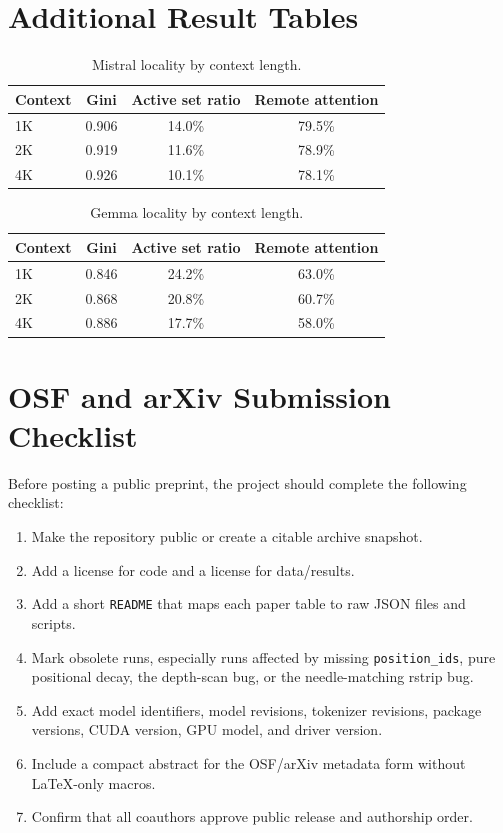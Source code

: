 \documentclass[11pt]{article}
\newcommand{\pct}{\%}
\theoremstyle{definition}
\theoremstyle{plain}
\begin{document}
\appendix

\section{Additional Result Tables}
\label{app:tables}

\begin{table}[h]
\centering
\caption{Mistral locality by context length.}
\small
\begin{tabular}{lccc}
\toprule
Context & Gini & Active set ratio & Remote attention \\
\midrule
1K & 0.906 & 14.0\pct{} & 79.5\pct{} \\
2K & 0.919 & 11.6\pct{} & 78.9\pct{} \\
4K & 0.926 & 10.1\pct{} & 78.1\pct{} \\
\bottomrule
\end{tabular}
\end{table}

\begin{table}[h]
\centering
\caption{Gemma locality by context length.}
\small
\begin{tabular}{lccc}
\toprule
Context & Gini & Active set ratio & Remote attention \\
\midrule
1K & 0.846 & 24.2\pct{} & 63.0\pct{} \\
2K & 0.868 & 20.8\pct{} & 60.7\pct{} \\
4K & 0.886 & 17.7\pct{} & 58.0\pct{} \\
\bottomrule
\end{tabular}
\end{table}

\section{OSF and arXiv Submission Checklist}
\label{app:checklist}

Before posting a public preprint, the project should complete the following checklist:
\begin{enumerate}[leftmargin=1.5em,itemsep=2pt]
  \item Make the repository public or create a citable archive snapshot.
  \item Add a license for code and a license for data/results.
  \item Add a short \texttt{README} that maps each paper table to raw JSON files and scripts.
  \item Mark obsolete runs, especially runs affected by missing \texttt{position\_ids}, pure positional decay, the depth-scan bug, or the needle-matching rstrip bug.
  \item Add exact model identifiers, model revisions, tokenizer revisions, package versions, CUDA version, GPU model, and driver version.
  \item Include a compact abstract for the OSF/arXiv metadata form without LaTeX-only macros.
  \item Confirm that all coauthors approve public release and authorship order.
\end{enumerate}
\end{document}
